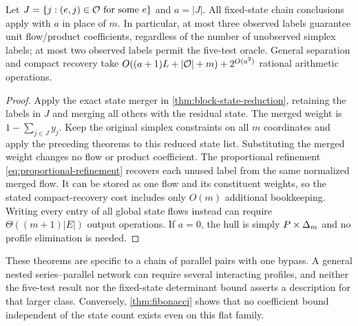 \begin{corollary}\label{cor:chain-observed-labels}
Let $J=\{j:(e,j)\in\mathcal O\text{ for some }e\}$ and $a=|J|$.
All fixed-state chain conclusions apply with $a$ in place of $m$.
In particular, at most three observed labels guarantee unit flow/product
coefficients, regardless of the number of unobserved simplex labels;
at most two observed labels permit the five-test oracle.
General separation and compact recovery take
$O((a+1)L+|\mathcal O|+m)+2^{O(a^2)}$ rational arithmetic operations.
\end{corollary}
\begin{proof}
Apply the exact state merger in \cref{thm:block-state-reduction},
retaining the labels in $J$ and merging all others with the residual
state. The merged weight is $1-\sum_{j\in J}y_j$.
Keep the original simplex constraints on all $m$ coordinates and
apply the preceding theorems to this reduced state list. Substituting
the merged weight changes no flow or product coefficient. The
proportional refinement \eqref{eq:proportional-refinement} recovers
each unused label from the same normalized merged flow. It can be
stored as one flow and its constituent weights, so the stated
compact-recovery cost includes only $O(m)$ additional bookkeeping.
Writing every entry of all global state flows instead can require
$\Theta((m+1)|E|)$ output operations. If $a=0$, the hull is simply
$P\times\Delta_m$ and no profile elimination is needed.
\end{proof}

These theorems are specific to a chain of parallel pairs with one bypass.
A general nested series--parallel network can require several interacting
profiles, and neither the five-test result nor the fixed-state
determinant bound asserts a description for that larger class.
Conversely, \cref{thm:fibonacci} shows that no coefficient bound
independent of the state count exists even on this flat family.
